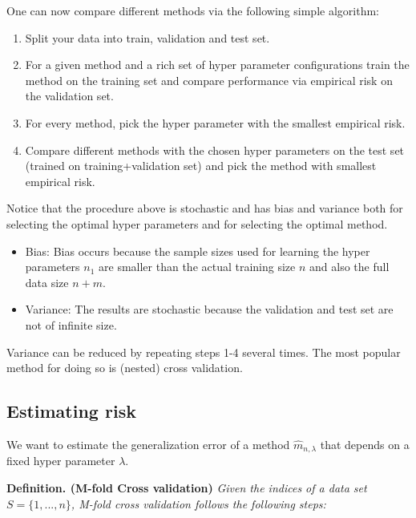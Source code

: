 \documentclass[
]{book}
\providecommand{\tightlist}{%
  \setlength{\itemsep}{0pt}\setlength{\parskip}{0pt}}
\begin{document}
One can now compare different methods via the following simple algorithm:

\begin{enumerate}
\def\labelenumi{\arabic{enumi}.}
\tightlist
\item
  Split your data into train, validation and test set.
\item
  For a given method and a rich set of hyper parameter configurations train the method on the training set and compare performance via empirical risk on the validation set.
\item
  For every method, pick the hyper parameter with the smallest empirical risk.
\item
  Compare different methods with the chosen hyper parameters on the test set (trained on training+validation set) and pick the method with smallest empirical risk.
\end{enumerate}

Notice that the procedure above is stochastic and has bias and variance both for selecting the optimal hyper parameters and for selecting the optimal method.

\begin{itemize}
\tightlist
\item
  Bias: Bias occurs because the sample sizes used for learning the hyper parameters \(n_1\) are smaller than the actual training size \(n\) and also the full data size \(n+m\).
\item
  Variance: The results are stochastic because the validation and test set are not of infinite size.
\end{itemize}

Variance can be reduced by repeating steps 1-4 several times. The most popular method for doing so is (nested) cross validation.

\hypertarget{estimating-risk}{%
\subsection{Estimating risk}\label{estimating-risk}}

We want to estimate the generalization error of a method \(\hat{m}_{n,\lambda}\) that depends on a fixed hyper parameter \(\lambda\).

\textbf{Definition. (M-fold Cross validation)} \emph{Given the indices of a data set \(S=\{1,...,n\}\), M-fold cross validation follows the following steps:}
\end{document}
